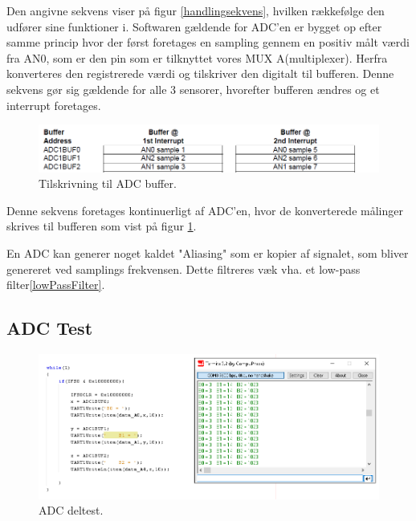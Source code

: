 Den angivne sekvens viser på figur \ref{handlingsekvens}, hvilken rækkefølge den udfører sine funktioner i. Softwaren gældende for ADC'en er bygget op efter samme princip hvor der først foretages en sampling gennem en positiv målt værdi fra AN0, som er den pin som er tilknyttet vores MUX A(multiplexer). Herfra konverteres den registrerede værdi og tilskriver den digitalt til bufferen. Denne sekvens gør sig gældende for alle 3 sensorer, hvorefter bufferen ændres og et interrupt foretages. 

\begin{figure}[h!]
  \centering
  \includegraphics[width=1.1\textwidth]{figures/adcBuffer.png}
  \caption{Tilskrivning til ADC buffer.}
  \label{adcBuffer}
\end{figure}

Denne sekvens foretages kontinuerligt af ADC'en, hvor de konverterede målinger skrives til bufferen som vist på figur \ref{adcBuffer}. 

En ADC kan generer noget kaldet "Aliasing" som er kopier af signalet, som bliver genereret ved samplings frekvensen. Dette filtreres væk vha. et low-pass filter\ref{lowPassFilter}.

\subsection{ADC Test}


\begin{figure}[h!]
  \centering
  \includegraphics[width=1.0\textwidth]{figures/adc_software_test.png}
  \caption{ADC deltest.}
  \label{adcDelTest}
\end{figure} 

